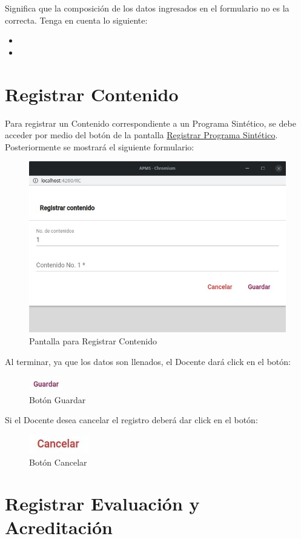\begin{itemize}
        Significa que la composición de los datos ingresados en el formulario no es la correcta. Tenga en cuenta lo siguiente:

        \begin{itemize}
            \item
            \item

        \end{itemize}

    \end{itemize}

\pagebreak
\hypertarget{Registrar Contenido}{\section{Registrar Contenido}}

Para registrar un Contenido correspondiente a un Programa Sintético, se debe acceder por medio del botón  de la pantalla \hyperlink{RegistrarPS}{Registrar Programa Sintético}. Posteriormente se mostrará el siguiente formulario:


\begin{figure}[H]
    \centering
    \hypertarget{RegistrarContenido}{\includegraphics[width=0.5\linewidth]{images/SP6/11.jpeg}}
    \caption{Pantalla para Registrar Contenido}
\end{figure}

Al terminar, ya que los datos son llenados, el Docente dará click en el botón:

\begin{figure}[H]
    \centering
    \includegraphics[width=0.1\linewidth]{images/SP6/BotonGuardar.jpeg}
    \caption{Botón Guardar}
\end{figure}

Si el Docente desea cancelar el registro deberá dar click en el botón:

\begin{figure}[H]
    \centering
    \includegraphics[width=0.1\linewidth]{images/SP6/BotonCancelar.jpeg}
    \caption{Botón Cancelar}
\end{figure}
\pagebreak
\hypertarget{REyA}{\section{Registrar Evaluación y Acreditación}}


